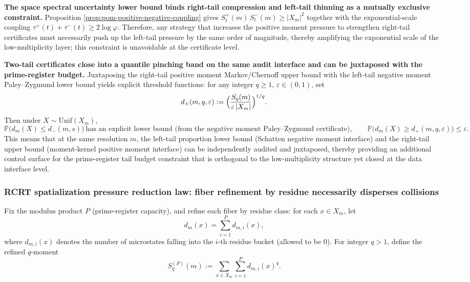 \medskip\noindent\textbf{The space spectral uncertainty lower bound binds right-tail compression and left-tail thinning as a mutually exclusive constraint.}
Proposition \ref{prop:pom-positive-negative-coupling} gives
\(
S_t^+(m)\,S_t^-(m)\ge |X_m|^2
\)
together with the exponential-scale coupling
\(
\tau^{+}(t)+\tau^{-}(t)\ge 2\log\varphi
\).
Therefore, any strategy that increases the positive moment pressure to strengthen right-tail certificates must necessarily push up the left-tail pressure by the same order of magnitude, thereby amplifying the exponential scale of the low-multiplicity layer; this constraint is unavoidable at the certificate level.

\medskip\noindent\textbf{Two-tail certificates close into a quantile pinching band on the same audit interface and can be juxtaposed with the prime-register budget.}
Juxtaposing the right-tail positive moment Markov/Chernoff upper bound with the left-tail negative moment Paley--Zygmund lower bound yields explicit threshold functions:
for any integer \(q\ge 1\), \(\varepsilon\in(0,1)\), set
\[
d_{+}(m,q,\varepsilon):=\Bigl(\frac{S_q(m)}{\varepsilon\,|X_m|}\Bigr)^{1/q}.
\]
Then under \(X\sim \mathrm{Unif}(X_m)\),
\[
\mathbb{P}\bigl(d_m(X)\le d_{-}(m,s)\bigr)\ \text{has an explicit lower bound (from the negative moment Paley--Zygmund certificate)},
\qquad
\mathbb{P}\bigl(d_m(X)\ge d_{+}(m,q,\varepsilon)\bigr)\le \varepsilon.
\]
This means that at the same resolution \(m\), the left-tail proportion lower bound (Schatten negative moment interface) and the right-tail upper bound (moment-kernel positive moment interface) can be independently audited and juxtaposed, thereby providing an additional control surface for the prime-register tail budget constraint that is orthogonal to the low-multiplicity structure yet closed at the data interface level.

\subsubsection{RCRT spatialization pressure reduction law: fiber refinement by residue necessarily disperses collisions}\label{subsec:pom-rcrt-pressure-reduction}
\begin{definition}\label{def:pom-residue-refined-moment}
Fix the modulus product \(P\) (prime-register capacity), and refine each fiber by residue class: for each \(x\in X_m\), let
$$
d_m(x)=\sum_{i=1}^{P} d_{m,i}(x),
$$
where \(d_{m,i}(x)\) denotes the number of microstates falling into the \(i\)-th residue bucket (allowed to be \(0\)).
For integer \(q>1\), define the refined \(q\)-moment
$$
S_q^{(P)}(m):=\sum_{x\in X_m}\sum_{i=1}^{P} d_{m,i}(x)^q.
$$
\end{definition}


